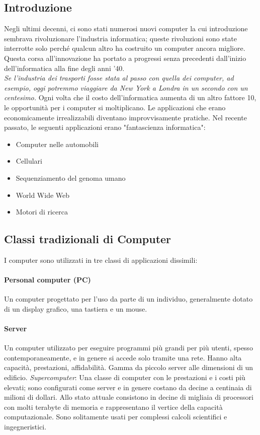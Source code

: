 \documentclass[12pt,a4paper]{article}
\begin{document}
\subsection{Introduzione}
Negli ultimi decenni, ci sono stati numerosi nuovi computer la cui introduzione sembrava rivoluzionare l'industria informatica; queste rivoluzioni sono state interrotte solo perché qualcun altro ha costruito un computer ancora migliore.\\
Questa corsa all'innovazione ha portato a progressi senza precedenti dall'inizio dell'informatica alla fine degli anni '40.\\
\textsl{Se l'industria dei trasporti fosse stata al passo con quella dei computer, ad esempio, oggi potremmo viaggiare da New York a Londra in un secondo con un centesimo.}
Ogni volta che il costo dell'informatica aumenta di un altro fattore 10, le opportunità per i computer si moltiplicano. Le applicazioni che erano economicamente irrealizzabili diventano improvvisamente pratiche.
Nel recente passato, le seguenti applicazioni erano "fantascienza informatica":
\begin{itemize}
\item Computer nelle automobili
\item Cellulari
\item Sequenziamento del genoma umano
\item World Wide Web
\item Motori di ricerca
\end{itemize}

\subsection{Classi tradizionali di Computer}
I computer sono utilizzati in tre classi di applicazioni dissimili:\\
\paragraph{Personal computer (PC)} Un computer progettato per l'uso da parte di un individuo, generalmente dotato di un display grafico, una tastiera e un mouse.\\
\paragraph{Server} Un computer utilizzato per eseguire programmi più grandi per più utenti, spesso contemporaneamente, e
in genere si accede solo tramite una rete. Hanno alta capacità, prestazioni, affidabilità. Gamma da piccolo server alle dimensioni di un edificio. \textsl{Supercomputer}: Una classe di computer con le prestazioni e i costi più elevati; sono configurati come
server e in genere costano da decine a centinaia di milioni di dollari. Allo stato attuale consistono in decine di migliaia di processori con molti terabyte di memoria e rappresentano il vertice della capacità computazionale. Sono solitamente usati per complessi calcoli scientifici
e ingegneristici.\\
\end{document}
